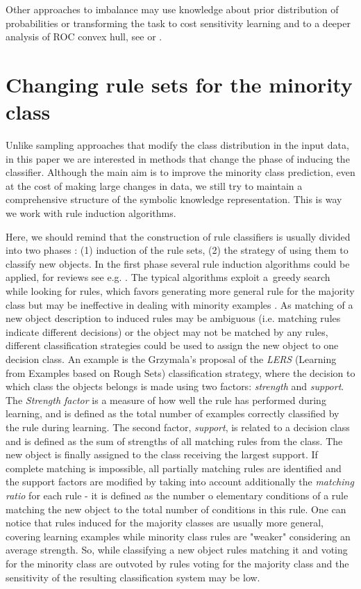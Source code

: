 \documentclass{AIMeth05}
\begin{document}
Other approaches to imbalance may use knowledge about prior distribution of
probabilities or transforming the task to cost sensitivity learning and to a
deeper analysis of ROC convex hull, see \cite{Gary} or \cite{Smote}.

\section{Changing rule sets for the minority class}

Unlike sampling approaches that modify the class distribution in the input
data, in this paper we are interested in methods that change the phase of
inducing the classifier. Although the main aim is to improve the minority
class prediction, even at the cost of making large changes in data, we
still try to maintain a comprehensive structure of the symbolic knowledge
representation. This is way we work with rule induction algorithms.

Here, we should remind that the construction of rule classifiers is usually
divided into two phases \cite{Stef01hab}: (1) induction of the rule sets,
(2) the strategy of using them to classify new objects. In the first phase
several rule induction algorithms could be applied, for reviews see e.g.
\cite{LEM2,Stef01hab}. The typical algorithms exploit
a~greedy search  while looking for rules, which favors generating more
general rule for the majority class but may be ineffective in dealing with
minority examples \cite{GrzymJSW,Gary}. As matching of a new object
description to induced rules may be ambiguous (i.e. matching rules indicate different decisions) or
the object may not be matched by any rules, different classification strategies
could be used to assign the new object to one decision
class. An example is the Grzymala's proposal of the {\em LERS} (Learning
from Examples based on Rough Sets) classification strategy, where
 the decision to which class the objects belongs is made using two
factors: \emph{strength} and \emph{support}. The \emph{Strength factor} is a
measure of how well the rule has performed during learning, and is defined
as the total number of examples correctly classified by the rule during
learning. The second factor, \emph{support}, is related to a decision class
and is defined as the sum of strengths of all matching rules from the class.
The new object is finally assigned to the class receiving the largest
support. If complete matching is impossible, all partially matching rules
are identified and the support factors are modified by taking into account
additionally the {\em matching ratio} for each rule - it is defined as the
number o elementary conditions of a rule matching the new object to the
total number of conditions in this rule. One can notice that rules induced
for the majority classes are usually more general, covering learning
examples while minority class rules are "weaker" considering an average
strength. So, while classifying a new object rules matching it and
voting for the minority class are outvoted by rules voting for the majority
class and the sensitivity of  the resulting classification system may be
low.
\end{document}
